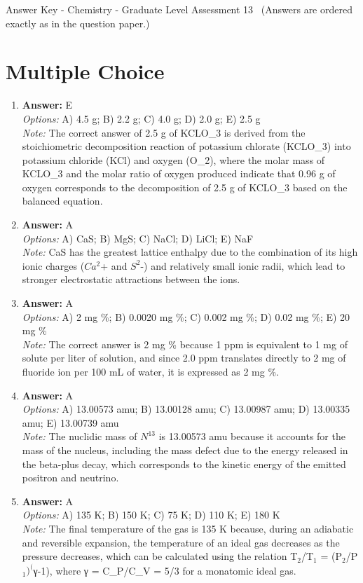\documentclass[12pt]{article}
\begin{document}
\begin{center}
Answer Key - Chemistry - Graduate Level Assessment 13 \
\small (Answers are ordered exactly as in the question paper.)
\end{center}

\section*{Multiple Choice}
\begin{enumerate}[label=\arabic*.]
\item \textbf{Answer:} E
\\ \textit{Options:} A) 4.5 g; B) 2.2 g; C) 4.0 g; D) 2.0 g; E) 2.5 g
\\ \textit{Note:} The correct answer of 2.5 g of KCLO\_3 is derived from the stoichiometric decomposition reaction of potassium chlorate (KCLO\_3) into potassium chloride (KCl) and oxygen (O\_2), where the molar mass of KCLO\_3 and the molar ratio of oxygen produced indicate that 0.96 g of oxygen corresponds to the decomposition of 2.5 g of KCLO\_3 based on the balanced equation.
\item \textbf{Answer:} A
\\ \textit{Options:} A) CaS; B) MgS; C) NaCl; D) LiCl; E) NaF
\\ \textit{Note:} CaS has the greatest lattice enthalpy due to the combination of its high ionic charges ($Ca^2$+ and $S^2$-) and relatively small ionic radii, which lead to stronger electrostatic attractions between the ions.
\item \textbf{Answer:} A
\\ \textit{Options:} A) 2 mg \%; B) 0.0020 mg \%; C) 0.002 mg \%; D) 0.02 mg \%; E) 20 mg \%
\\ \textit{Note:} The correct answer is 2 mg \% because 1 ppm is equivalent to 1 mg of solute per liter of solution, and since 2.0 ppm translates directly to 2 mg of fluoride ion per 100 mL of water, it is expressed as 2 mg \%.
\item \textbf{Answer:} A
\\ \textit{Options:} A) 13.00573 amu; B) 13.00128 amu; C) 13.00987 amu; D) 13.00335 amu; E) 13.00739 amu
\\ \textit{Note:} The nuclidic mass of $N^13$ is 13.00573 amu because it accounts for the mass of the nucleus, including the mass defect due to the energy released in the beta-plus decay, which corresponds to the kinetic energy of the emitted positron and neutrino.
\item \textbf{Answer:} A
\\ \textit{Options:} A) 135 K; B) 150 K; C) 75 K; D) 110 K; E) 180 K
\\ \textit{Note:} The final temperature of the gas is 135 K because, during an adiabatic and reversible expansion, the temperature of an ideal gas decreases as the pressure decreases, which can be calculated using the relation T$_{2}$/T$_{1}$ = (P$_{2}$/P$_{1}$$)^($γ-1), where γ = C\_P/C\_V = 5/3 for a monatomic ideal gas.
\end{enumerate}
\end{document}
